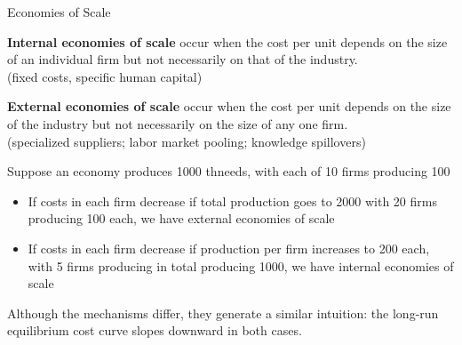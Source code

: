\documentclass[notes,11pt, aspectratio=169, xcolor=table]{beamer}
\newenvironment{wideitemize}{\itemize\addtolength{\itemsep}{10pt}}{\enditemize}
\begin{document}
\begin{frame}{Economies of Scale}

\begin{wideitemize}
    
    \item \textbf{Internal economies of scale} occur when the cost per unit depends on the size of an individual firm but not necessarily on that of the industry.
    \\ \qquad (fixed costs, specific human capital) 
    
    \item<2-> \textbf{External economies of scale} occur when the cost per unit depends on the size of the industry but not necessarily on the size of any one firm.
    \\ \qquad (specialized suppliers; labor market pooling; knowledge spillovers)

    \item<3-> Suppose an economy produces 1000 thneeds, with each of 10 firms producing 100

    \begin{itemize}
        \item If costs in each firm decrease if total production goes to 2000 with 20 firms producing 100 each, we have external economies of scale
        \item If costs in each firm decrease if production per firm increases to 200 each, with 5 firms producing in total producing 1000, we have internal economies of scale
    \end{itemize}

    \item<4-> Although the mechanisms differ, they generate a similar intuition: the long-run equilibrium cost curve slopes downward in both cases.


\end{wideitemize}
    
\end{frame}
\end{document}
